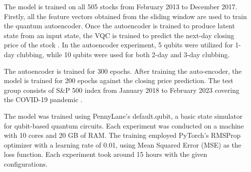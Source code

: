 \documentclass[conference]{IEEEtran}
\begin{document}
The model is trained on all 505 stocks from February 2013 to December 2017. Firstly, all the feature vectors obtained from the sliding window are used to train the quantum autoencoder. Once the autoencoder is trained to produce latent state from an input state, the VQC is trained to predict the next-day closing price of the stock \cite{b18}. In the autoencoder experiment, 5 qubits were utilized for 1-day clubbing, while 10 qubits were used for both 2-day and 3-day clubbing.

The autoencoder is trained for 300 epochs. After training the auto-encoder, the model is trained for 200 epochs against the closing price prediction. The test group consists of S\&P 500 index from January 2018 to February 2023 covering the COVID-19 pandemic \cite{b19}.

The model was trained using PennyLane's default.qubit, a basic state simulator for qubit-based quantum circuits. Each experiment was conducted on a machine with 10 cores and 20 GB of RAM. The training employed PyTorch's RMSProp optimizer with a learning rate of 0.01, using Mean Squared Error (MSE) as the loss function. Each experiment took around 15 hours with the given configurations.
\end{document}
